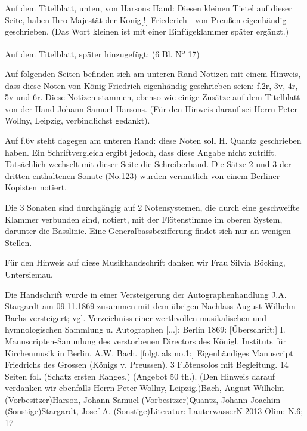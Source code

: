 \documentclass[a4paper, twocolumn, 11pt]{book}
\begin{document}
\par Auf dem Titelblatt, unten, von Harsons Hand: {\textquotedbl}Diesen kleinen Tietel auf dieser Seite, haben Ihro Majestät der Konig[!] Friederich | von Preußen eigenhändig geschrieben.{\textquotedbl} (Das Wort {\textquotedbl}kleinen{\textquotedbl} ist mit einer Einfügeklammer später ergänzt.)
\par Auf dem Titelblatt, später hinzugefügt: {\textquotedbl}(6 Bl. N\textsuperscript{o} 17){\textquotedbl}
\par Auf folgenden Seiten befinden sich am unteren Rand Notizen mit einem Hinweis, dass {\textquotedbl}diese Noten{\textquotedbl} von König Friedrich eigenhändig geschrieben seien: f.2r, 3v, 4r, 5v und 6r. Diese Notizen stammen, ebenso wie einige Zusätze auf dem Titelblatt von der Hand Johann Samuel Harsons. (Für den Hinweis darauf sei Herrn Peter Wollny, Leipzig, verbindlichst gedankt).
\par Auf f.6v steht dagegen am unteren Rand: {\textquotedbl}diese Noten soll H. Quantz geschrieben haben.{\textquotedbl} Ein Schriftvergleich ergibt jedoch, dass diese Angabe nicht zutrifft. Tatsächlich wechselt mit dieser Seite die Schreiberhand. Die Sätze 2 und 3 der dritten enthaltenen Sonate (No.123) wurden vermutlich von einem Berliner Kopisten notiert.
\par Die 3 Sonaten sind durchgängig auf 2 Notensystemen, die durch eine geschweifte Klammer verbunden sind, notiert, mit der Flötenstimme im oberen System, darunter die Basslinie. Eine Generalbassbezifferung findet sich nur an wenigen Stellen.
\par Für den Hinweis auf diese Musikhandschrift danken wir Frau Silvia Böcking, Untersiemau.
\par Die Handschrift wurde in einer Versteigerung der Autographenhandlung J.A. Stargardt am 09.11.1869 zusammen mit dem übrigen Nachlass August Wilhelm Bachs versteigert; vgl. {\textquotedbl}Verzeichniss einer werthvollen musikalischen und hymnologischen Sammlung u. Autographen [...]{\textquotedbl}; Berlin 1869: [Überschrift:] {\textquotedbl}I. Manuscripten-Sammlung des verstorbenen Directors des Königl. Instituts für Kirchenmusik in Berlin, A.W. Bach.{\textquotedbl} [folgt als no.1:] {\textquotedbl}Eigenhändiges Manuscript Friedrichs des Grossen (Königs v. Preussen). 3 Flötensolos mit Begleitung. 14 Seiten fol. (Schatz ersten Ranges.) (Angebot 50 th.){\textquotedbl}. (Den Hinweis darauf verdanken wir ebenfalls Herrn Peter Wollny, Leipzig.)\newline Bach, August Wilhelm  (Vorbesitzer)\newline Harson, Johann Samuel  (Vorbesitzer)\newline Quantz, Johann Joachim  (Sonstige)\newline Stargardt, Josef A.  (Sonstige)\newline Literatur: LauterwasserN 2013  \newline Olim: N.6; 17
\end{document}
